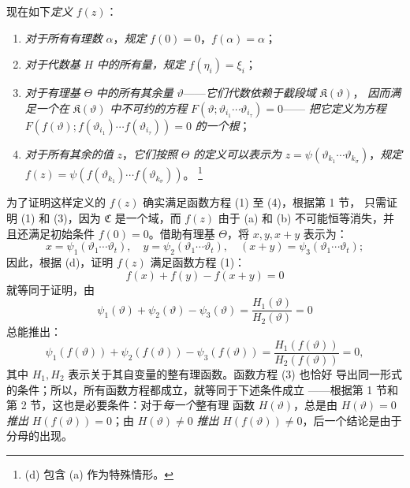 \documentclass[11pt]{article}
\providecommand{\Cfield}{\mathfrak C}
\providecommand{\Kfield}{\mathfrak K}
\providecommand{\srcfn}[2]{%
  \begingroup\renewcommand{\thefootnote}{#1}\footnote{#2}\addtocounter{footnote}{-1}\endgroup}
\begin{document}
现在如下\emph{定义} \(f(z)\)：
\begin{enumerate}
\item[(a)] \emph{对于所有有理数} \(\alpha\)，\emph{规定}
\(f(0)=0\)，\(f(\alpha)=\alpha\)；
\item[(b)] \emph{对于代数基} \(H\) \emph{中的所有量，规定}
\(f(\eta_i)=\xi_i\)；
\item[(c)] \emph{对于有理基} \(\Theta\) \emph{中的所有其余量}
\(\vartheta\)——\emph{它们代数依赖于截段域} \(\Kfield(\vartheta)\)，
\emph{因而满足一个在} \(\Kfield(\vartheta)\) \emph{中不可约的方程}
\(F(\vartheta;\vartheta_{i_1}\cdots\vartheta_{i_\tau})=0\)——
\emph{把它定义为方程}
\(F(f(\vartheta);f(\vartheta_{i_1})\cdots f(\vartheta_{i_\tau}))=0\)
\emph{的一个根}；
\item[(d)] \emph{对于所有其余的值} \(z\)，\emph{它们按照}
\(\Theta\) \emph{的定义可以表示为}
\(z=\psi(\vartheta_{k_1}\cdots\vartheta_{k_\sigma})\)，\emph{规定}
\(f(z)=\psi(f(\vartheta_{k_1})\cdots f(\vartheta_{k_\sigma}))\)。
\srcfn{*)}{(d) 包含 (a) 作为特殊情形。}
\end{enumerate}
为了证明这样定义的 \(f(z)\) 确实满足函数方程 (1) 至 (4)，根据第 1 节，
只需证明 (1) 和 (3)，因为 \(\Cfield\) 是一个域，而 \(f(z)\) 由于
(a) 和 (b) 不可能恒等消失，并且还满足初始条件 \(f(0)=0\)。借助有理基
\(\Theta\)，将 \(x,y,x+y\) 表示为：
\[
x=\psi_1(\vartheta_1\cdots\vartheta_t),\quad
 y=\psi_2(\vartheta_1\cdots\vartheta_t),\quad
 (x+y)=\psi_3(\vartheta_1\cdots\vartheta_t);
\]
因此，根据 (d)，证明 \(f(z)\) 满足函数方程 (1)：
\[
f(x)+f(y)-f(x+y)=0
\]
就等同于证明，由
\[
\psi_1(\vartheta)+\psi_2(\vartheta)-\psi_3(\vartheta)
 =\frac{H_1(\vartheta)}{H_2(\vartheta)}=0
\]
总能推出：
\[
\psi_1(f(\vartheta))+\psi_2(f(\vartheta))-\psi_3(f(\vartheta))
 =\frac{H_1(f(\vartheta))}{H_2(f(\vartheta))}=0,
\]
其中 \(H_1,H_2\) 表示关于其自变量的整有理函数。函数方程 (3) 也恰好
导出同一形式的条件；所以，所有函数方程都成立，就等同于下述条件成立
——根据第 1 节和第 2 节，这也是必要条件：对于\emph{每一个}整有理
函数 \(H(\vartheta)\)，总是由 \(H(\vartheta)=0\) \emph{推出}
\(H(f(\vartheta))=0\)；由 \(H(\vartheta)\ne0\) \emph{推出}
\(H(f(\vartheta))\ne0\)，后一个结论是由于分母的出现。
\end{document}
